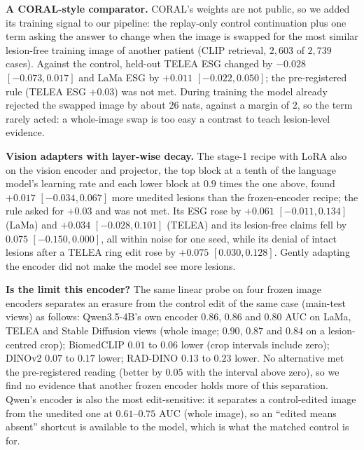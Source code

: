 \documentclass{article} %
\begin{document}
\textbf{A CORAL-style comparator.} CORAL's weights are not public, so we added its training signal to our pipeline: the replay-only control continuation plus one term asking the answer to change when the image is swapped for the most similar lesion-free training image of another patient (CLIP retrieval, $2{,}603$ of $2{,}739$ cases). Against the control, held-out TELEA ESG changed by $-0.028$ $[-0.073, 0.017]$ and LaMa ESG by $+0.011$ $[-0.022, 0.050]$; the pre-registered rule (TELEA ESG $+0.03$) was not met. During training the model already rejected the swapped image by about $26$ nats, against a margin of $2$, so the term rarely acted: a whole-image swap is too easy a contrast to teach lesion-level evidence.

\textbf{Vision adapters with layer-wise decay.} The stage-1 recipe with LoRA also on the vision encoder and projector, the top block at a tenth of the language model's learning rate and each lower block at $0.9$ times the one above, found $+0.017$ $[-0.034, 0.067]$ more unedited lesions than the frozen-encoder recipe; the rule asked for $+0.03$ and was not met. Its ESG rose by $+0.061$ $[-0.011, 0.134]$ (LaMa) and $+0.034$ $[-0.028, 0.101]$ (TELEA) and its lesion-free claims fell by $0.075$ $[-0.150, 0.000]$, all within noise for one seed, while its denial of intact lesions after a TELEA ring edit rose by $+0.075$ $[0.030, 0.128]$. Gently adapting the encoder did not make the model see more lesions.

\textbf{Is the limit this encoder?} The same linear probe on four frozen image encoders separates an erasure from the control edit of the same case (main-test views) as follows: Qwen3.5-4B's own encoder $0.86$, $0.86$ and $0.80$ AUC on LaMa, TELEA and Stable Diffusion views (whole image; $0.90$, $0.87$ and $0.84$ on a lesion-centred crop); BiomedCLIP $0.01$ to $0.06$ lower (crop intervals include zero); DINOv2 $0.07$ to $0.17$ lower; RAD-DINO $0.13$ to $0.23$ lower. No alternative met the pre-registered reading (better by $0.05$ with the interval above zero), so we find no evidence that another frozen encoder holds more of this separation. Qwen's encoder is also the most edit-sensitive: it separates a control-edited image from the unedited one at $0.61$--$0.75$ AUC (whole image), so an ``edited means absent'' shortcut is available to the model, which is what the matched control is for.
\end{document}
